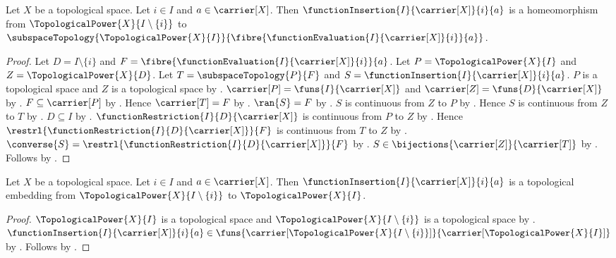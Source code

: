 \begin{theorem}\label{topological_power_insertion_homeomorphism}
    Let $X$ be a topological space.
    Let $i\in I$ and $a\in\carrier[X]$.
    Then $\functionInsertion{I}{\carrier[X]}{i}{a}$ is a homeomorphism from
        $\TopologicalPower{X}{I\setminus\{i\}}$ to
        $\subspaceTopology{\TopologicalPower{X}{I}}{
            \fibre{\functionEvaluation{I}{\carrier[X]}{i}}{a}}$.
\end{theorem}
\begin{proof}
    Let $D=I\setminus\{i\}$ and $F=\fibre{\functionEvaluation{I}{\carrier[X]}{i}}{a}$.
    Let $P=\TopologicalPower{X}{I}$ and $Z=\TopologicalPower{X}{D}$.
    Let $T=\subspaceTopology{P}{F}$ and $S=\functionInsertion{I}{\carrier[X]}{i}{a}$.
    $P$ is a topological space and $Z$ is a topological space by
        .
    $\carrier[P]=\funs{I}{\carrier[X]}$ and $\carrier[Z]=\funs{D}{\carrier[X]}$ by
        .
    $F\subseteq\carrier[P]$ by .
    Hence $\carrier[T]=F$ by .
    $\ran{S}=F$ by .
    $S$ is continuous from $Z$ to $P$ by .
    Hence $S$ is continuous from $Z$ to $T$ by
        .
    $D\subseteq I$ by .
    $\functionRestriction{I}{D}{\carrier[X]}$ is continuous from $P$ to $Z$ by
        .
    Hence $\restrl{\functionRestriction{I}{D}{\carrier[X]}}{F}$ is continuous from $T$ to $Z$
        by .
    $\converse{S}=\restrl{\functionRestriction{I}{D}{\carrier[X]}}{F}$ by
        .
    $S\in\bijections{\carrier[Z]}{\carrier[T]}$ by .
    Follows by .
\end{proof}

\begin{corollary}\label{topological_power_insertion_embedding}
    Let $X$ be a topological space.
    Let $i\in I$ and $a\in\carrier[X]$.
    Then $\functionInsertion{I}{\carrier[X]}{i}{a}$ is a topological embedding from
        $\TopologicalPower{X}{I\setminus\{i\}}$ to $\TopologicalPower{X}{I}$.
\end{corollary}
\begin{proof}
    $\TopologicalPower{X}{I}$ is a topological space and
        $\TopologicalPower{X}{I\setminus\{i\}}$ is a topological space by
        .
    $\functionInsertion{I}{\carrier[X]}{i}{a}\in
        \funs{\carrier[\TopologicalPower{X}{I\setminus\{i\}}]}{
            \carrier[\TopologicalPower{X}{I}]}$ by
        .
    Follows by .
\end{proof}
